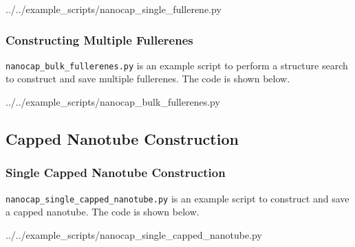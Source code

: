 %
			{../../example_scripts/nanocap_single_fullerene.py}

\subsubsection{Constructing Multiple Fullerenes }

\verb|nanocap_bulk_fullerenes.py| is an example script to perform a structure search to construct and save multiple fullerenes. The code is shown below.

%
			{../../example_scripts/nanocap_bulk_fullerenes.py}

\subsection{Capped Nanotube Construction}

\subsubsection{Single Capped Nanotube Construction}

\verb|nanocap_single_capped_nanotube.py| is an example script to construct and save a capped nanotube. The code is shown below.

%
			{../../example_scripts/nanocap_single_capped_nanotube.py}

